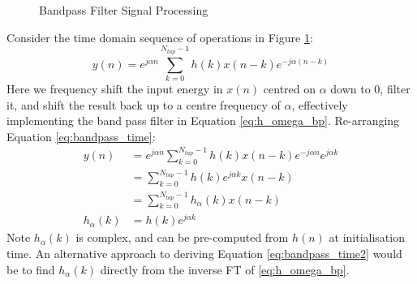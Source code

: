 \documentclass{article}
\begin{document}
\begin{figure}[h]
\caption{Bandpass Filter Signal Processing}
\label{fig:bandpass_proc}
\vspace{5mm}
\begin{center}
\end{center}
\end{figure}

Consider the time domain sequence of operations in Figure \ref{fig:bandpass_proc}:
\begin{equation} \label{eq:bandpass_time}
y(n) = e^{j \alpha n} \sum_{k=0}^{N_{tap}-1} h(k) x(n-k) e^{-j \alpha (n-k)}
\end{equation}
Here we frequency shift the input energy in $x(n)$ centred on $\alpha$ down to 0, filter it, and shift the result back up to a centre frequency of $\alpha$, effectively implementing the band pass filter in Equation \ref{eq:h_omega_bp}.  Re-arranging Equation \ref{eq:bandpass_time}:
\begin{equation} \label{eq:bandpass_time2}
\begin{split}
y(n) &= e^{j \alpha n} \sum_{k=0}^{N_{tap}-1}  h(k) x(n-k) e^{-j \alpha n} e^{j \alpha k} \\
     &= \sum_{k=0}^{N_{tap}-1} h(k) e^{j \alpha k} x(n-k) \\
     &= \sum_{k=0}^{N_{tap}-1} h_{\alpha}(k) x(n-k) \\
h_{\alpha}(k) &= h(k) e^{j \alpha k}     
\end{split}
\end{equation}
Note $h_{\alpha}(k)$ is complex, and can be pre-computed from $h(n)$ at initialisation time. An alternative approach to deriving Equation \ref{eq:bandpass_time2} would be to find $h_{\alpha}(k)$ directly from the inverse FT of \eqref{eq:h_omega_bp}.
\end{document}
